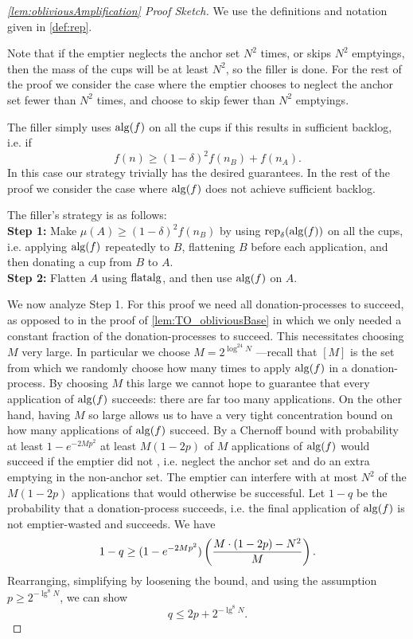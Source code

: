 \begin{proof}[\cref{lem:obliviousAmplification} Proof Sketch]
  We use the definitions and notation given in \cref{def:rep}. 

  Note that if the emptier neglects the anchor set $N^2$ times,
  or skips $N^2$ emptyings, then the mass of the cups will be at
  least $N^2$, so the filler is done. For the rest of the proof
  we consider the case where the emptier chooses to neglect
  the anchor set fewer than $N^2$ times, and choose to skip fewer
  than $N^2$ emptyings.

  The filler simply uses $\operatorname{\text{\textup{alg}}}(f)$ on all the cups if this
  results in sufficient backlog, i.e. if
  $$f(n) \ge (1-\delta)^2 f(n_B) + f(n_A).$$
  In this case our strategy trivially has the desired guarantees. 
  In the rest of the proof we consider the case where $\operatorname{\text{\textup{alg}}}(f)$
  does not achieve sufficient backlog.

  The filler's strategy is as follows:\\
  \textbf{Step 1:} Make $\mu(A) \ge (1-\delta)^2 f(n_B)$ by
  using $\operatorname{\text{\textup{rep}}}_\delta(\operatorname{\text{\textup{alg}}}(f))$ on all the cups,
  i.e. applying $\operatorname{\text{\textup{alg}}}(f)$ repeatedly to $B$, flattening $B$ before
  each application, and then donating a cup from $B$ to $A$.\\
  \textbf{Step 2:} Flatten $A$ using $\operatorname{\text{\textup{flatalg}}}$, and then use
  $\operatorname{\text{\textup{alg}}}(f)$ on $A$.

  We now analyze Step 1.
  For this proof we need all donation-processes to succeed, as
  opposed to in the proof of
  \cref{lem:TO_obliviousBase} in which we only needed
  a constant fraction of the donation-processes to succeed. This
  necessitates choosing $M$ very large. In particular we choose
  $M = 2^{\log^{24} N}$ ---recall that $[M]$ is the set from
  which we randomly choose how many times to apply $\operatorname{\text{\textup{alg}}}(f)$ in a
  donation-process. By choosing $M$ this large we cannot hope to
  guarantee that every application of $\operatorname{\text{\textup{alg}}}(f)$ succeeds: there
  are far too many applications. On the other hand, having $M$ so
  large allows us to have a very tight concentration bound on how
  many applications of $\operatorname{\text{\textup{alg}}}(f)$ succeed. By a Chernoff bound
  with probability at least $1-e^{-2Mp^2}$ at least $M(1-2p)$ of
  $M$ applications of $\operatorname{\text{\textup{alg}}}(f)$ would succeed if the emptier did
  not , i.e. neglect the anchor set and do an
  extra emptying in the non-anchor set. The emptier can interfere
  with at most $N^2$ of the $M(1-2p)$ applications that would
  otherwise be successful. Let $1-q$ be the probability that a
  donation-process succeeds, i.e. the final application of
  $\operatorname{\text{\textup{alg}}}(f)$ is not emptier-wasted and succeeds. We have $$1-q \ge
  (1-e^{-2Mp^2})\left( \frac{M\cdot (1-2p)-N^2}{M} \right).$$
  Rearranging, simplifying by loosening the bound, and using the
  assumption $p \ge 2^{-\lg^8 N}$, we can show $$q \le 2p +
  2^{-\lg^8 N}.$$


\end{proof}

